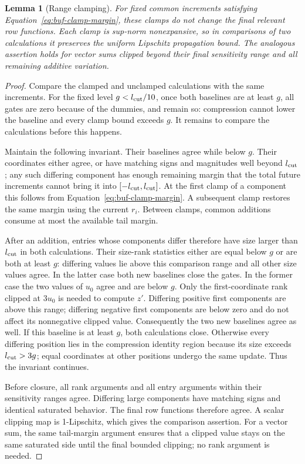 \documentclass[11pt]{article}
\numberwithin{equation}{section}
\newtheorem{lemma}[theorem]{Lemma}
\theoremstyle{definition}
\theoremstyle{remark}
\begin{document}
\begin{lemma}[Range clamping]
\label{lem:buf-clamping}
For fixed common increments satisfying
Equation~\eqref{eq:buf-clamp-margin}, these clamps do not change the
final relevant row functions.  Each clamp is sup-norm nonexpansive, so
in comparisons of two calculations it preserves the uniform Lipschitz
propagation bound.  The analogous assertion holds for vector sums clipped
beyond their final sensitivity range and all remaining additive variation.
\end{lemma}
\begin{proof}
Compare the clamped and unclamped calculations with the same increments.
For the fixed level ${g}<{l_{\rm cut}}/10$, once both baselines are at
least ${g}$, all gates are zero because of the dummies, and remain so:
compression cannot lower the baseline and every clamp bound exceeds ${g}$.
It remains to compare the calculations before this happens.

Maintain the following invariant.  Their baselines agree while below ${g}$.
Their coordinates either agree, or have matching signs and magnitudes
well beyond ${l_{\rm cut}}$; any such differing component has enough remaining
margin that the total future increments cannot bring it into
$[-{l_{\rm cut}},{l_{\rm cut}}]$.  At the first clamp of a component this follows from
Equation~\eqref{eq:buf-clamp-margin}.  A subsequent clamp restores the
same margin using the current ${r}_i$.  Between clamps, common additions
consume at most the available tail margin.

After an addition, entries whose components differ therefore have size
larger than ${l_{\rm cut}}$ in both calculations.  Their size-rank statistics either
are equal below ${g}$ or are both at least ${g}$: differing values lie above
this comparison range and all other size values agree.
In the latter case both new baselines close the gates.  In the former
case the two values of $u_0$ agree and are below ${g}$.
Only the first-coordinate rank clipped at $3u_0$ is needed to compute
$z'$.  Differing positive first components are above this range;
differing negative first components are below zero and do not affect
its nonnegative clipped value.  Consequently the two new baselines
agree as well.  If this baseline is at least ${g}$, both calculations
close.  Otherwise every differing position lies in the compression
identity region because its size exceeds ${l_{\rm cut}}>3{g}$; equal coordinates at
other positions undergo the same update.  Thus the invariant continues.

Before closure, all rank arguments and all entry arguments within their
sensitivity ranges agree.  Differing large components have matching
signs and identical saturated behavior.  The final row functions
therefore agree.  A scalar clipping map is 1-Lipschitz, which gives the
comparison assertion.  For a vector sum, the same tail-margin argument
ensures that a clipped value stays on the same saturated side until the
final bounded clipping; no rank argument is needed.
\end{proof}
\end{document}
